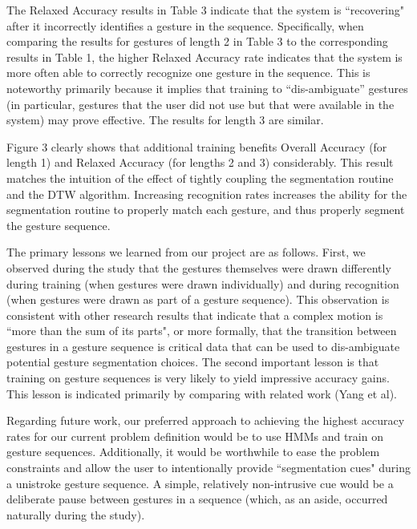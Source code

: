 \documentclass[twoside]{article}
\begin{document}
\begin{multicols}{2}
The Relaxed Accuracy results in Table 3 indicate that the system is
``recovering" after it incorrectly identifies a gesture in the sequence.
Specifically, when comparing the results for gestures of length 2 in Table 3 to
the corresponding results in Table 1, the higher Relaxed Accuracy rate indicates
that the system is more often able to correctly recognize one gesture in the
sequence.
This is noteworthy primarily because it implies that training to
``dis-ambiguate'' gestures (in particular, gestures that the user did not use
but that were available in the system) may prove effective. The results for
length 3 are similar.

Figure 3 clearly shows that additional training benefits Overall Accuracy (for
length 1) and Relaxed Accuracy (for lengths 2 and 3) considerably.
This result matches the intuition of the effect of tightly coupling the
segmentation routine and the DTW algorithm. Increasing recognition rates
increases the ability for the segmentation routine to properly match each
gesture, and thus properly segment the gesture sequence.




The primary lessons we learned from our project are as follows. First, we
observed during the study that the gestures themselves were drawn differently
during training (when gestures were drawn individually) and during
recognition (when gestures were drawn as part of a gesture sequence). This
observation is consistent with other research results that indicate
that a complex motion is ``more than the sum of its parts", or more formally,
that the transition between gestures in a gesture sequence is critical
data that can be used to dis-ambiguate potential gesture segmentation choices.
The second important lesson is that training on gesture sequences is very likely
to yield impressive accuracy gains. This lesson is indicated primarily by
comparing with related work (Yang et al).

Regarding future work, our preferred approach to achieving the highest accuracy
rates for our current problem definition would be to use HMMs and train on
gesture sequences. Additionally, it would be worthwhile to ease the problem
constraints and allow the user to intentionally provide ``segmentation cues"
during a unistroke gesture sequence. A simple, relatively non-intrusive cue
would be a deliberate pause between gestures in a sequence (which, as an aside,
occurred naturally during the study).


\end{multicols}
\end{document}
